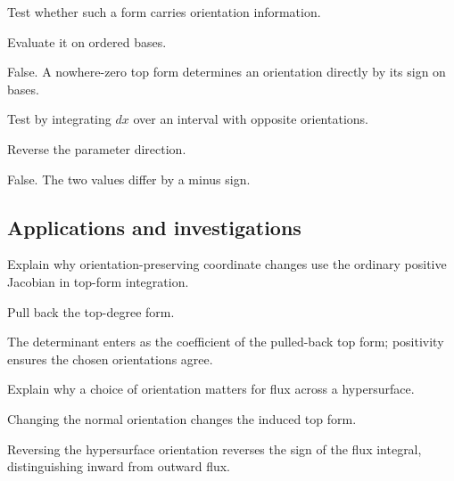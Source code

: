 \begin{exercise}\label{exr:vii10-ped-11}
Test whether such a form carries orientation information.
\end{exercise}
\begin{hint}
Evaluate it on ordered bases.
\end{hint}
\begin{solution}
False.  A nowhere-zero top form determines an orientation directly by its sign on bases.
\end{solution}

\begin{exercise}\label{exr:vii10-ped-12}
Test by integrating \(dx\) over an interval with opposite orientations.
\end{exercise}
\begin{hint}
Reverse the parameter direction.
\end{hint}
\begin{solution}
False.  The two values differ by a minus sign.
\end{solution}

\subsection*{Applications and investigations}

\begin{exercise}\label{exr:vii10-ped-13}
Explain why orientation-preserving coordinate changes use the ordinary positive Jacobian in top-form integration.
\end{exercise}
\begin{hint}
Pull back the top-degree form.
\end{hint}
\begin{solution}
The determinant enters as the coefficient of the pulled-back top form; positivity ensures the chosen orientations agree.
\end{solution}

\begin{exercise}\label{exr:vii10-ped-14}
Explain why a choice of orientation matters for flux across a hypersurface.
\end{exercise}
\begin{hint}
Changing the normal orientation changes the induced top form.
\end{hint}
\begin{solution}
Reversing the hypersurface orientation reverses the sign of the flux integral, distinguishing inward from outward flux.
\end{solution}

